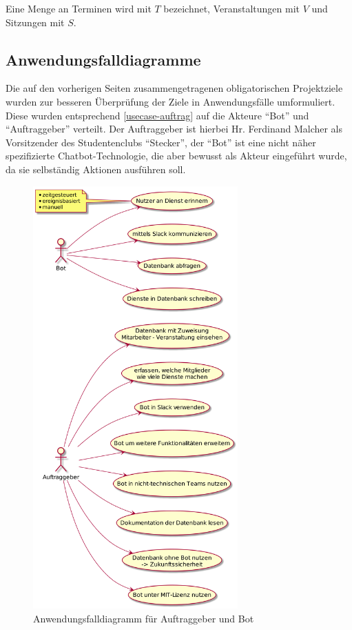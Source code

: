 Eine Menge an Terminen wird mit $T$ bezeichnet, Veranstaltungen mit $V$ und Sitzungen mit $S$.

\subsection{Anwendungsfalldiagramme}

Die auf den vorherigen Seiten zusammengetragenen obligatorischen Projektziele wurden zur besseren Überprüfung der Ziele in Anwendungsfälle umformuliert. Diese wurden entsprechend \autoref{usecase-auftrag} auf die Akteure \enquote{Bot} und \enquote{Auftraggeber} verteilt.
Der Auftraggeber ist hierbei Hr. Ferdinand Malcher als Vorsitzender des Studentenclubs \enquote{Stecker}, der \enquote{Bot} ist eine nicht näher spezifizierte Chatbot-Technologie, die aber bewusst als Akteur eingeführt wurde, da sie selbständig Aktionen ausführen soll.

\begin{figure}[htbp]
    \includegraphics[width=0.7\textwidth]{../docs/uml/usecase-stakeholder.png}
    \caption{Anwendungsfalldiagramm für Auftraggeber und Bot}
    \label{usecase-auftrag}
\end{figure}

